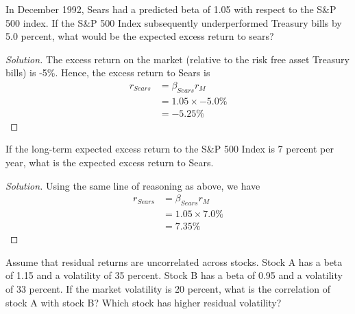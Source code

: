 \begin{problem}{2.1}
 In December 1992, Sears had a predicted beta of 1.05 with respect to the S\&P 500 index. If the S\&P 500 Index subsequently underperformed Treasury bills by 5.0 percent, what would be the expected excess return to sears?
\end{problem}

\begin{proof}[Solution]
 The excess return on the market (relative to the risk free asset Treasury bills) is -5\%. Hence, the excess return to Sears is
 \begin{align*}
  r_{Sears} &= \beta_{Sears}r_{M} \\
            &= 1.05 \times -5.0\% \\
            &= -5.25 \%
 \end{align*}

\end{proof}

\begin{problem}{2.2}
 If the long-term expected excess return to the S\&P 500 Index is 7 percent per year, what is the expected excess return to Sears.
\end{problem}

\begin{proof}[Solution]
 Using the same line of reasoning as above, we have
 \begin{align*}
  r_{Sears} &= \beta_{Sears}r_{M} \\
            &= 1.05 \times 7.0\% \\
            &= 7.35 \%
 \end{align*}
\end{proof}

\begin{problem}{2.3}
 Assume that residual returns are uncorrelated across stocks. Stock A has a beta of 1.15 and a volatility of 35 percent. Stock B has a beta of 0.95 and a volatility of 33 percent. If the market volatility is 20 percent, what is the correlation of stock A with stock B? Which stock has higher residual volatility?
\end{problem}

